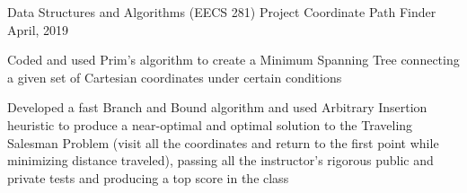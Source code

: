 \begin{cventries}
  \cventry
    {Data Structures and Algorithms (EECS 281) Project} 
    {Coordinate Path Finder} 
    {April, 2019} 
    {}
    {
      \begin{cvitems} %
        \item {Coded and used Prim's algorithm to create a Minimum Spanning Tree connecting a given set of Cartesian coordinates under certain conditions}
        \item {Developed a fast Branch and Bound algorithm and used Arbitrary Insertion heuristic to produce a near-optimal and optimal solution
        to the Traveling Salesman Problem (visit all the coordinates and return to the first point while minimizing distance traveled), 
        passing all the instructor's rigorous public and private tests and producing a top score in the class}
      \end{cvitems}
    }
\end{cventries}
